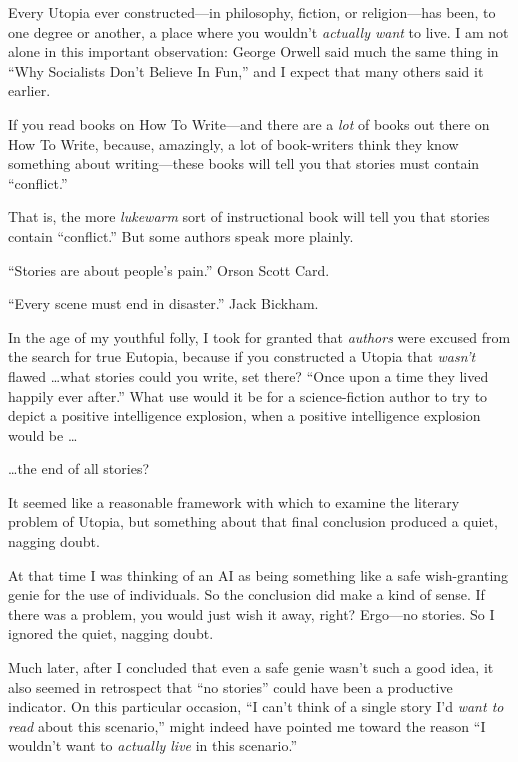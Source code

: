 
{
 Every Utopia ever constructed---in philosophy, fiction, or
religion---has been, to one degree or another, a place where you
wouldn't \textit{actually want} to live. I am not alone
in this important observation: George Orwell said much the same thing
in ``Why Socialists Don't Believe In
Fun,'' and I expect that many others said it earlier.
}

{
 If you read books on How To Write---and there are a \textit{lot}
of books out there on How To Write, because, amazingly, a lot of
book-writers think they know something about writing---these books will
tell you that stories must contain
``conflict.''}

{
 That is, the more \textit{lukewarm} sort of instructional book
will tell you that stories contain
``conflict.'' But some authors speak
more plainly.}

{
 ``Stories are about people's
pain.'' Orson Scott Card.}

{
 ``Every scene must end in
disaster.'' Jack Bickham.}

{
 In the age of my youthful folly, I took for granted that
\textit{authors} were excused from the search for true Eutopia, because
if you constructed a Utopia that \textit{wasn't} flawed
\ldots what stories could you write, set there? ``Once
upon a time they lived happily ever after.'' What use
would it be for a science-fiction author to try to depict a positive
intelligence explosion, when a positive intelligence explosion would be
\ldots}

{
 \ldots the end of all stories?}

{
 It seemed like a reasonable framework with which to examine the
literary problem of Utopia, but something about that final conclusion
produced a quiet, nagging doubt.}

{
 At that time I was thinking of an AI as being something like a
safe wish-granting genie for the use of individuals. So the conclusion
did make a kind of sense. If there was a problem, you would just wish
it away, right? Ergo---no stories. So I ignored the quiet, nagging
doubt.}

{
 Much later, after I concluded that even a safe genie
wasn't such a good idea, it also seemed in retrospect
that ``no stories'' could have been
a productive indicator. On this particular occasion,
``I can't think of a single story
I'd \textit{want to read} about this
scenario,'' might indeed have pointed me toward the
reason ``I wouldn't want to
\textit{actually live} in this scenario.''}


